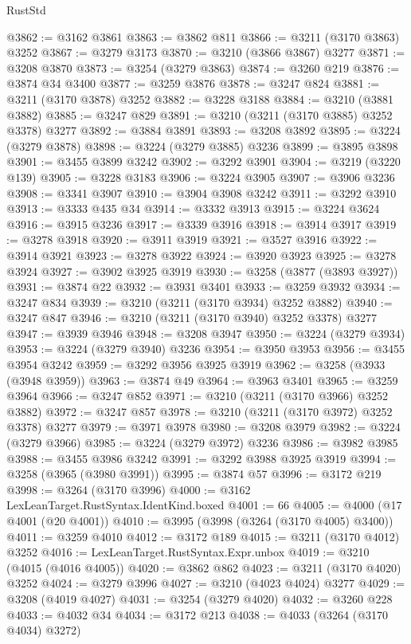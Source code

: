 \begin{lexlean}{RustStd}
\begin{coremodule}
@3862 := @3162 @3861
@3863 := @3862 @811
@3866 := @3211 (@3170 @3863) @3252
@3867 := @3279 @3173
@3870 := @3210 (@3866 @3867) @3277
@3871 := @3208 @3870
@3873 := @3254 (@3279 @3863)
@3874 := @3260 @219
@3876 := @3874 @34 @3400
@3877 := @3259 @3876
@3878 := @3247 @824
@3881 := @3211 (@3170 @3878) @3252
@3882 := @3228 @3188
@3884 := @3210 (@3881 @3882)
@3885 := @3247 @829
@3891 := @3210 (@3211 (@3170 @3885) @3252 @3378) @3277
@3892 := @3884 @3891
@3893 := @3208 @3892
@3895 := @3224 (@3279 @3878)
@3898 := @3224 (@3279 @3885) @3236
@3899 := @3895 @3898
@3901 := @3455 @3899 @3242
@3902 := @3292 @3901
@3904 := @3219 (@3220 @139)
@3905 := @3228 @3183
@3906 := @3224 @3905
@3907 := @3906 @3236
@3908 := @3341 @3907
@3910 := @3904 @3908 @3242
@3911 := @3292 @3910
@3913 := @3333 @435 @34
@3914 := @3332 @3913
@3915 := @3224 @3624
@3916 := @3915 @3236
@3917 := @3339 @3916
@3918 := @3914 @3917
@3919 := @3278 @3918
@3920 := @3911 @3919
@3921 := @3527 @3916
@3922 := @3914 @3921
@3923 := @3278 @3922
@3924 := @3920 @3923
@3925 := @3278 @3924
@3927 := @3902 @3925 @3919
@3930 := @3258 (@3877 (@3893 @3927))
@3931 := @3874 @22
@3932 := @3931 @3401
@3933 := @3259 @3932
@3934 := @3247 @834
@3939 := @3210 (@3211 (@3170 @3934) @3252 @3882)
@3940 := @3247 @847
@3946 := @3210 (@3211 (@3170 @3940) @3252 @3378) @3277
@3947 := @3939 @3946
@3948 := @3208 @3947
@3950 := @3224 (@3279 @3934)
@3953 := @3224 (@3279 @3940) @3236
@3954 := @3950 @3953
@3956 := @3455 @3954 @3242
@3959 := @3292 @3956 @3925 @3919
@3962 := @3258 (@3933 (@3948 @3959))
@3963 := @3874 @49
@3964 := @3963 @3401
@3965 := @3259 @3964
@3966 := @3247 @852
@3971 := @3210 (@3211 (@3170 @3966) @3252 @3882)
@3972 := @3247 @857
@3978 := @3210 (@3211 (@3170 @3972) @3252 @3378) @3277
@3979 := @3971 @3978
@3980 := @3208 @3979
@3982 := @3224 (@3279 @3966)
@3985 := @3224 (@3279 @3972) @3236
@3986 := @3982 @3985
@3988 := @3455 @3986 @3242
@3991 := @3292 @3988 @3925 @3919
@3994 := @3258 (@3965 (@3980 @3991))
@3995 := @3874 @57
@3996 := @3172 @219
@3998 := @3264 (@3170 @3996)
@4000 := @3162 LexLeanTarget.RustSyntax.IdentKind.boxed
@4001 := 66
@4005 := @4000 (@17 @4001 (@20 @4001))
@4010 := @3995 (@3998 (@3264 (@3170 @4005) @3400))
@4011 := @3259 @4010
@4012 := @3172 @189
@4015 := @3211 (@3170 @4012) @3252
@4016 := LexLeanTarget.RustSyntax.Expr.unbox
@4019 := @3210 (@4015 (@4016 @4005))
@4020 := @3862 @862
@4023 := @3211 (@3170 @4020) @3252
@4024 := @3279 @3996
@4027 := @3210 (@4023 @4024) @3277
@4029 := @3208 (@4019 @4027)
@4031 := @3254 (@3279 @4020)
@4032 := @3260 @228
@4033 := @4032 @34
@4034 := @3172 @213
@4038 := @4033 (@3264 (@3170 @4034) @3272)

\end{coremodule}
\end{lexlean}

